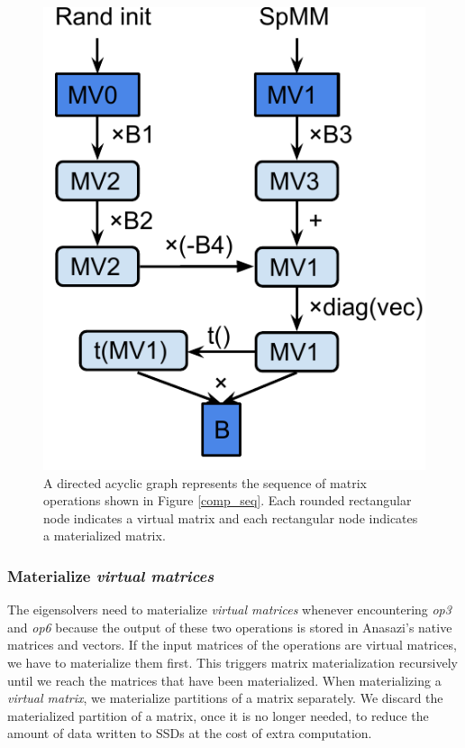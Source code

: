 \begin{figure}
\centering
\includegraphics[scale=0.5]{./dag.pdf}
\vspace{-5pt}
\caption{A directed acyclic graph represents the sequence of matrix operations
shown in Figure \ref{comp_seq}. Each rounded rectangular node indicates
a virtual matrix and each rectangular node indicates a materialized matrix.}
\vspace{-5pt}
\label{dag}
\end{figure}


\subsubsection{Materialize \textit{virtual matrices}}
The eigensolvers need to materialize \textit{virtual matrices} whenever
encountering \textit{op3} and \textit{op6} because the output of these two
operations is stored in Anasazi's native matrices and vectors. If the input
matrices of the operations are virtual matrices, we have to materialize them
first. This triggers matrix materialization recursively until we reach
the matrices that have been materialized. When materializing
a \textit{virtual matrix}, we materialize partitions of a matrix separately.
We discard the materialized partition of a matrix, once it is no longer needed,
to reduce the amount of data written to SSDs at the cost of extra computation.

